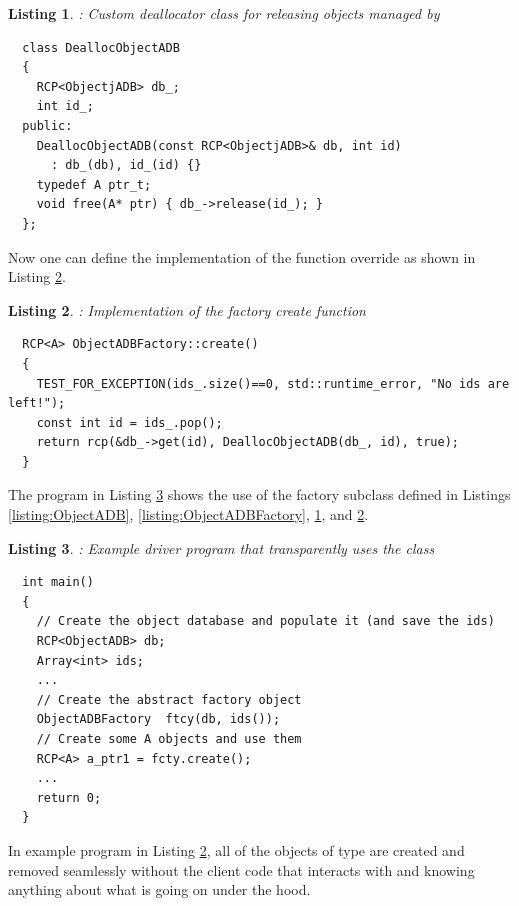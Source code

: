 \documentclass[pdf,ps2pdf,11pt]{SANDreport}
\newtheorem{listing}{Listing}
\begin{document}
{}\begin{listing}: Custom deallocator class for releasing objects
managed by {}
\label{listing:DeallocObjectADB}
{\small\begin{verbatim}
  class DeallocObjectADB
  {
    RCP<ObjectjADB> db_;
    int id_;
  public:
    DeallocObjectADB(const RCP<ObjectjADB>& db, int id)
      : db_(db), id_(id) {}
    typedef A ptr_t;
    void free(A* ptr) { db_->release(id_); }
  };
\end{verbatim}}
\end{listing}


Now one can define the implementation of the {} function
override as shown in Listing {}\ref{listing:ObjectADBFactory_create}.


{}\begin{listing}: Implementation of the factory create function
\label{listing:ObjectADBFactory_create}
{\small\begin{verbatim}
  RCP<A> ObjectADBFactory::create()
  {
    TEST_FOR_EXCEPTION(ids_.size()==0, std::runtime_error, "No ids are left!");
    const int id = ids_.pop();
    return rcp(&db_->get(id), DeallocObjectADB(db_, id), true);
  }
\end{verbatim}}
\end{listing}


The program in Listing {}\ref{listing:ObjectADBFactory-examplep-main}
shows the use of the factory subclass {} defined
in Listings {}\ref{listing:ObjectADB},
{}\ref{listing:ObjectADBFactory}, {}\ref{listing:DeallocObjectADB},
and {}\ref{listing:ObjectADBFactory_create}.


{}\begin{listing}: Example driver program that transparently uses the
{} class
\label{listing:ObjectADBFactory-examplep-main}
{\small\begin{verbatim}
  int main()
  {
    // Create the object database and populate it (and save the ids)
    RCP<ObjectADB> db;
    Array<int> ids;
    ...
    // Create the abstract factory object
    ObjectADBFactory  ftcy(db, ids());
    // Create some A objects and use them
    RCP<A> a_ptr1 = fcty.create();
    ...
    return 0;
  }
\end{verbatim}}
\end{listing}


In example program in Listing {}\ref{listing:ObjectADBFactory_create},
all of the objects of type {} are created and removed
seamlessly without the client code that interacts with {} and
{} knowing anything about what is going on under
the hood.
\end{document}
